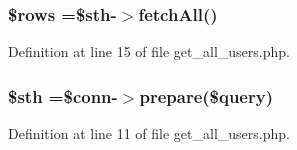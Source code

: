 \hypertarget{get__all__users_8php_ace2ec39e7df3899fa8df9640ec274b03}{
\subsubsection[{\$rows}]{\setlength{\rightskip}{0pt plus 5cm}\$rows =\$sth-\/$>$fetch\-All()}}\label{get__all__users_8php_ace2ec39e7df3899fa8df9640ec274b03}


Definition at line 15 of file get\-\_\-all\-\_\-users.\-php.

\hypertarget{get__all__users_8php_afa9126f9664959c02795be300a135f93}{
\subsubsection[{\$sth}]{\setlength{\rightskip}{0pt plus 5cm}\$sth =\$conn-\/$>$prepare(\$query)}}\label{get__all__users_8php_afa9126f9664959c02795be300a135f93}


Definition at line 11 of file get\-\_\-all\-\_\-users.\-php.

